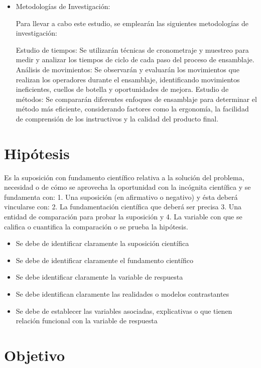 \begin{itemize}
        \item Metodologías de Investigación:
    
    Para llevar a cabo este estudio, se emplearán las siguientes metodologías de investigación:
    
    Estudio de tiempos: Se utilizarán técnicas de cronometraje y muestreo para medir y analizar los tiempos de ciclo de cada paso del proceso de ensamblaje.
    Análisis de movimientos: Se observarán y evaluarán los movimientos que realizan los operadores durante el ensamblaje, identificando movimientos ineficientes, cuellos de botella y oportunidades de mejora.
    Estudio de métodos: Se compararán diferentes enfoques de ensamblaje para determinar el método más eficiente, considerando factores como la ergonomía, la facilidad de comprensión de los instructivos y la calidad del producto final.
    \end{itemize}
    \section{Hipótesis}
    
    Es la suposición con fundamento científico relativa a la solución del problema, necesidad o de cómo se aprovecha la oportunidad con la incógnita científica y se fundamenta con: 1. Una suposición (en afirmativo o negativo) y ésta deberá vincularse con:
    2. La fundamentación científica que deberá ser precisa 3. Una entidad de comparación para probar la suposición y
    4. La variable con que se califica o cuantifica la comparación o se prueba la hipótesis.
    
    \begin{itemize}
        \item Se debe de identificar claramente la suposición científica
        \item Se debe de identificar claramente el fundamento científico
        \item Se debe identificar claramente la variable de respuesta
        \item Se debe identifican claramente las realidades o modelos contrastantes
        \item Se debe de establecer las variables asociadas, explicativas o que tienen relación funcional con la variable de respuesta
    \end{itemize}
    \section{Objetivo}
    
